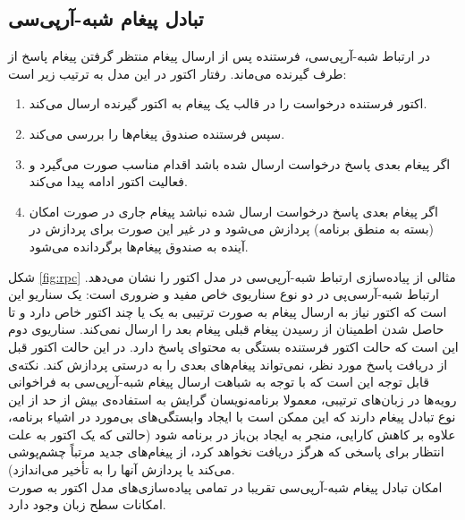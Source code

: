 \subsection{تبادل پیغام شبه-آرپی‌سی}
در ارتباط شبه‌-آرپی‌سی، فرستنده‌ پس از ارسال پیغام منتظر گرفتن پیغام پاسخ از طرف گیرنده می‌ماند. رفتار اکتور در این مدل به ترتیب زیر است:
\begin{enumerate}
\item اکتور فرستنده درخواست را در قالب یک پیغام به اکتور گیرنده ارسال می‌کند.
\item سپس فرستنده صندوق پیغام‌ها را بررسی می‌کند.   
\item اگر پیغام بعدی پاسخ درخواست ارسال شده باشد اقدام مناسب صورت می‌گیرد و فعالیت اکتور ادامه پیدا می‌کند.
\item اگر پیغام بعدی پاسخ درخواست ارسال شده نباشد پیغام جاری در صورت امکان (بسته به منطق برنامه) پردازش می‌شود و در غیر این صورت برای پردازش در آینده به صندوق پیغام‌ها برگردانده می‌شود.
\end{enumerate}
شکل \ref{fig:rpc} مثالی از  پیاده‌سازی ارتباط شبه-آرپی‌سی در مدل اکتور را نشان می‌دهد. ارتباط شبه-آرسی‌پی در دو نوع سناریوی خاص مفید و ضروری است: یک سناریو این است که اکتور نیاز به ارسال پیغام به صورت ترتیبی به یک یا چند اکتور خاص دارد و تا حاصل شدن اطمینان از رسیدن پیغام قبلی پیغام بعد را ارسال نمی‌کند. سناریوی دوم این است که حالت اکتور فرستنده بستگی به محتوای پاسخ دارد. در این حالت اکتور قبل از دریافت پاسخ مورد نظر، نمی‌تواند پیغام‌های بعدی را به درستی پردازش کند. نکته‌ی قابل توجه این است که با توجه به شباهت ارسال پیغام شبه-آرپی‌سی به فراخوانی رویه‌ها در زبان‌های \gls{ترتیبی}، معمولا برنامه‌نویسان گرایش به استفاده‌ی بیش از حد از این نوع تبادل پیغام دارند که این ممکن است با ایجاد وابستگی‌های بی‌مورد در اشیاء برنامه، علاوه بر کاهش کارایی، منجر به ایجاد \gls{بن‌باز} در برنامه شود (حالتی که یک اکتور به علت انتظار برای پاسخی که هرگز دریافت نخواهد کرد، از پیغام‌های جدید مرتباً چشم‌پوشی می‌کند یا پردازش آنها را به تأخیر می‌اندازد).\\
امکان تبادل پیغام شبه-آرپی‌سی تقریبا در تمامی پیاده‌سازی‌های مدل اکتور به صورت امکانات سطح زبان وجود دارد\cite{ActorsJVM2009}.

